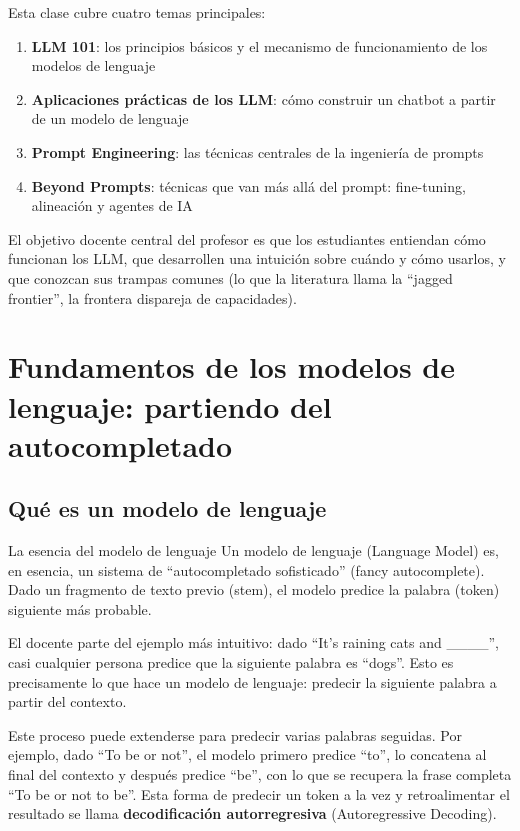 \documentclass[a4paper]{article}
\begin{document}
Esta clase cubre cuatro temas principales:
\begin{enumerate}
    \item \textbf{LLM 101}: los principios básicos y el mecanismo de funcionamiento de los modelos de lenguaje
    \item \textbf{Aplicaciones prácticas de los LLM}: cómo construir un chatbot a partir de un modelo de lenguaje
    \item \textbf{Prompt Engineering}: las técnicas centrales de la ingeniería de prompts
    \item \textbf{Beyond Prompts}: técnicas que van más allá del prompt: fine-tuning, alineación y agentes de IA
\end{enumerate}

El objetivo docente central del profesor es que los estudiantes entiendan cómo funcionan los LLM, que desarrollen una intuición sobre cuándo y cómo usarlos, y que conozcan sus trampas comunes (lo que la literatura llama la ``jagged frontier'', la frontera dispareja de capacidades).

\section{Fundamentos de los modelos de lenguaje: partiendo del autocompletado}

\subsection{Qué es un modelo de lenguaje}

\begin{importantbox}{La esencia del modelo de lenguaje}
Un modelo de lenguaje (Language Model) es, en esencia, un sistema de ``autocompletado sofisticado'' (fancy autocomplete). Dado un fragmento de texto previo (stem), el modelo predice la palabra (token) siguiente más probable.
\end{importantbox}

El docente parte del ejemplo más intuitivo: dado ``It's raining cats and \_\_\_\_'', casi cualquier persona predice que la siguiente palabra es ``dogs''. Esto es precisamente lo que hace un modelo de lenguaje: predecir la siguiente palabra a partir del contexto.

Este proceso puede extenderse para predecir varias palabras seguidas. Por ejemplo, dado ``To be or not'', el modelo primero predice ``to'', lo concatena al final del contexto y después predice ``be'', con lo que se recupera la frase completa ``To be or not to be''. Esta forma de predecir un token a la vez y retroalimentar el resultado se llama \textbf{decodificación autorregresiva} (Autoregressive Decoding).
\end{document}
